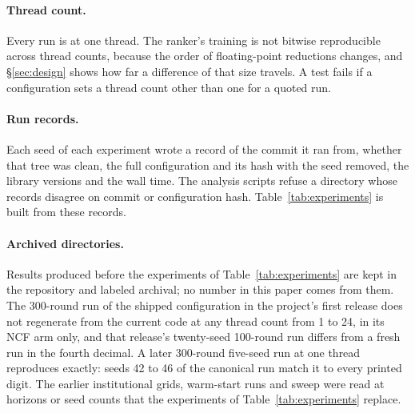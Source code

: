 \paragraph{Thread count.} Every run is at one thread. The ranker's training is
not bitwise reproducible across thread counts, because the order of floating-point
reductions changes, and \S\ref{sec:design} shows how far a difference of that size
travels. A test fails if a configuration sets a thread count other than one for a
quoted run.

\paragraph{Run records.} Each seed of each experiment wrote a record of the
commit it ran from, whether that tree was clean, the full configuration and its
hash with the seed removed, the library versions and the wall time. The analysis
scripts refuse a directory whose records disagree on commit or configuration
hash. Table~\ref{tab:experiments} is built from these records.

\paragraph{Archived directories.} Results produced before the experiments of
Table~\ref{tab:experiments} are kept in the repository and labeled archival; no
number in this paper comes from them. The 300-round run of the shipped
configuration in the project's first release does not regenerate from the current
code at any thread count from 1 to 24, in its NCF arm only, and that release's
twenty-seed 100-round run differs from a fresh run in the fourth decimal. A later
300-round five-seed run at one thread reproduces exactly: seeds 42 to 46 of the
canonical run match it to every printed digit. The earlier institutional grids,
warm-start runs and sweep were read at horizons or seed counts that the
experiments of Table~\ref{tab:experiments} replace.
